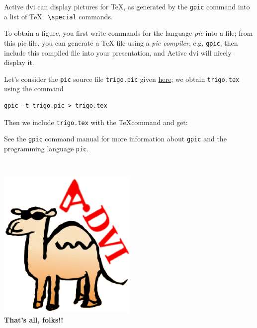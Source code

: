 \documentclass[12pt]{article}
\begin{document}
Active dvi can display pictures for \TeX, as generated by
the \verb"gpic" command into a list of \TeX~ \verb"\special" commands.

\bigskip

To obtain a figure, you first write commands for the language
{\em pic} into a file; from this pic file, you can generate a \TeX
file using a {\em pic compiler}, e.g. \verb"gpic"; then include this
compiled file into your presentation, and Active dvi will nicely display it.

Let's consider the \verb"pic" source file \verb"trigo.pic" given
\hyperref{trigo_source.dvi}{}{}{here}; we obtain
\verb"trigo.tex" using the command 
\begin{verbatim}
gpic -t trigo.pic > trigo.tex
\end{verbatim}

Then we include \verb"trigo.tex" with the \TeX command
\verb|| and get:

\def\showgraph{%
  \par\medskip\centerline{\raise 1em\box\graph}\bigskip\noindent\ignorespaces}



See the \verb"gpic" command manual for more information about
\verb"gpic" and the programming language \verb"pic".

\lastpage

~\vfill
\begin{center}
\includegraphics[width=0.5\textwidth]{../tex/advilogo.eps}\\
{\Large \bf That's all, folks!!}
\end{center}
\vfill
\end{document}
